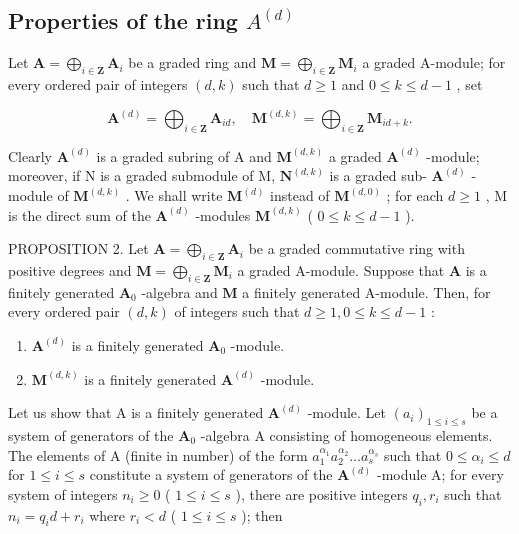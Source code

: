 \subsection{\texorpdfstring{Properties of the ring \(A^{(d)}\)}{Properties of the ring A(d)}}

Let \(\mathbf{A} = \bigoplus_{i\in \mathbf{Z}}\mathbf{A}_i\) be a graded ring and \(\mathbf{M} = \bigoplus_{i\in \mathbf{Z}}\mathbf{M}_i\) a graded A-module; for every ordered pair of integers \((d, k)\) such that \(d \geqslant 1\) and \(0 \leqslant k \leqslant d - 1\) , set

\[
\mathbf {A} ^ {(d)} = \bigoplus_ {i \in \mathbf {Z}} \mathbf {A} _ {i d}, \quad \mathbf {M} ^ {(d, k)} = \bigoplus_ {i \in \mathbf {Z}} \mathbf {M} _ {i d + k}.
\]

Clearly \(\mathbf{A}^{(d)}\) is a graded subring of A and \(\mathbf{M}^{(d,k)}\) a graded \(\mathbf{A}^{(d)}\) -module; moreover, if N is a graded submodule of M, \(\mathbf{N}^{(d,k)}\) is a graded sub- \(\mathbf{A}^{(d)}\) -module of \(\mathbf{M}^{(d,k)}\) . We shall write \(\mathbf{M}^{(d)}\) instead of \(\mathbf{M}^{(d,0)}\) ; for each \(d \geqslant 1\) , M is the direct sum of the \(\mathbf{A}^{(d)}\) -modules \(\mathbf{M}^{(d,k)}\) ( \(0 \leqslant k \leqslant d - 1\) ).

PROPOSITION 2. Let \(\mathbf{A} = \bigoplus_{i\in \mathbf{Z}}\mathbf{A}_i\) be a graded commutative ring with positive degrees and \(\mathbf{M} = \bigoplus_{i\in \mathbf{Z}}\mathbf{M}_i\) a graded A-module. Suppose that \(\mathbf{A}\) is a finitely generated \(\mathbf{A}_0\) -algebra and \(\mathbf{M}\) a finitely generated A-module. Then, for every ordered pair \((d,k)\) of integers such that \(d\geqslant 1,0\leqslant k\leqslant d - 1\) :

\begin{enumerate}
\def\labelenumi{(\roman{enumi})}
\item
  \(\mathbf{A}^{(d)}\) is a finitely generated \(\mathbf{A}_0\) -module.
\item
  \(\mathbf{M}^{(d,k)}\) is a finitely generated \(\mathbf{A}^{(d)}\) -module.
\end{enumerate}

Let us show that A is a finitely generated \(\mathbf{A}^{(d)}\) -module. Let \((a_{i})_{1\leqslant i\leqslant s}\) be a system of generators of the \(\mathbf{A}_0\) -algebra A consisting of homogeneous elements. The elements of A (finite in number) of the form \(a_1^{\alpha_1}a_2^{\alpha_2}\ldots a_s^{\alpha_s}\) such that \(0\leqslant \alpha_{i}\leqslant d\) for \(1\leqslant i\leqslant s\) constitute a system of generators of the \(\mathbf{A}^{(d)}\) -module A; for every system of integers \(n_i\geqslant 0\) ( \(1\leqslant i\leqslant s\) ), there are positive integers \(q_{i}, r_{i}\) such that \(n_i = q_id + r_i\) where \(r_i < d\) ( \(1\leqslant i\leqslant s\) ); then

